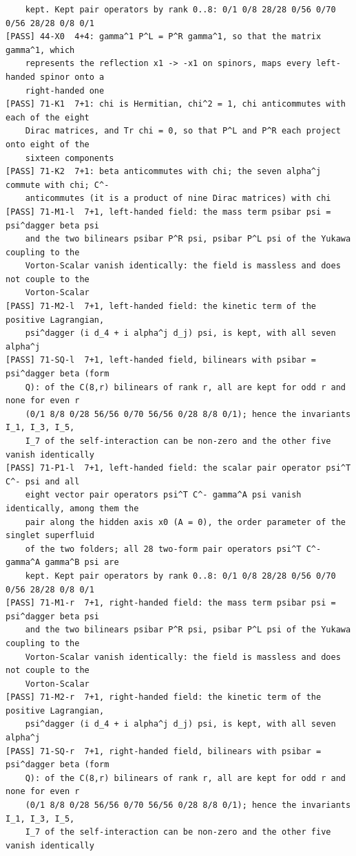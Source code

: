 \documentclass[
  10pt,
]{article}
\begin{document}
\begin{verbatim}
    kept. Kept pair operators by rank 0..8: 0/1 0/8 28/28 0/56 0/70 0/56 28/28 0/8 0/1
[PASS] 44-X0  4+4: gamma^1 P^L = P^R gamma^1, so that the matrix gamma^1, which
    represents the reflection x1 -> -x1 on spinors, maps every left-handed spinor onto a
    right-handed one
[PASS] 71-K1  7+1: chi is Hermitian, chi^2 = 1, chi anticommutes with each of the eight
    Dirac matrices, and Tr chi = 0, so that P^L and P^R each project onto eight of the
    sixteen components
[PASS] 71-K2  7+1: beta anticommutes with chi; the seven alpha^j commute with chi; C^-
    anticommutes (it is a product of nine Dirac matrices) with chi
[PASS] 71-M1-l  7+1, left-handed field: the mass term psibar psi = psi^dagger beta psi
    and the two bilinears psibar P^R psi, psibar P^L psi of the Yukawa coupling to the
    Vorton-Scalar vanish identically: the field is massless and does not couple to the
    Vorton-Scalar
[PASS] 71-M2-l  7+1, left-handed field: the kinetic term of the positive Lagrangian,
    psi^dagger (i d_4 + i alpha^j d_j) psi, is kept, with all seven alpha^j
[PASS] 71-SQ-l  7+1, left-handed field, bilinears with psibar = psi^dagger beta (form
    Q): of the C(8,r) bilinears of rank r, all are kept for odd r and none for even r
    (0/1 8/8 0/28 56/56 0/70 56/56 0/28 8/8 0/1); hence the invariants I_1, I_3, I_5,
    I_7 of the self-interaction can be non-zero and the other five vanish identically
[PASS] 71-P1-l  7+1, left-handed field: the scalar pair operator psi^T C^- psi and all
    eight vector pair operators psi^T C^- gamma^A psi vanish identically, among them the
    pair along the hidden axis x0 (A = 0), the order parameter of the singlet superfluid
    of the two folders; all 28 two-form pair operators psi^T C^- gamma^A gamma^B psi are
    kept. Kept pair operators by rank 0..8: 0/1 0/8 28/28 0/56 0/70 0/56 28/28 0/8 0/1
[PASS] 71-M1-r  7+1, right-handed field: the mass term psibar psi = psi^dagger beta psi
    and the two bilinears psibar P^R psi, psibar P^L psi of the Yukawa coupling to the
    Vorton-Scalar vanish identically: the field is massless and does not couple to the
    Vorton-Scalar
[PASS] 71-M2-r  7+1, right-handed field: the kinetic term of the positive Lagrangian,
    psi^dagger (i d_4 + i alpha^j d_j) psi, is kept, with all seven alpha^j
[PASS] 71-SQ-r  7+1, right-handed field, bilinears with psibar = psi^dagger beta (form
    Q): of the C(8,r) bilinears of rank r, all are kept for odd r and none for even r
    (0/1 8/8 0/28 56/56 0/70 56/56 0/28 8/8 0/1); hence the invariants I_1, I_3, I_5,
    I_7 of the self-interaction can be non-zero and the other five vanish identically

\end{verbatim}
\end{document}
